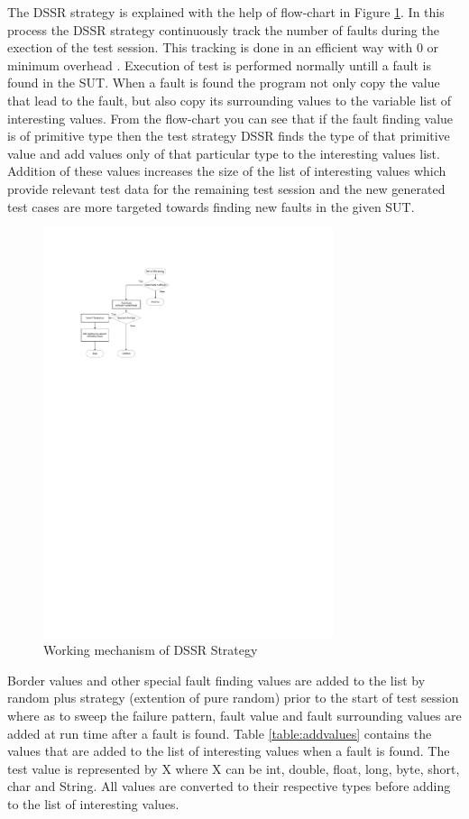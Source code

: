 \documentclass[10pt, conference, compsocconf]{IEEEtran}
\begin{document}
\hspace{10 mm}The DSSR strategy is explained with the help of flow-chart in Figure \ref{fig:Working_DSSS}. In this process the DSSR strategy continuously track the number of faults during the exection of the test session. This tracking is done in an efficient way with 0 or minimum overhead \cite{Leitner2009}. Execution of test is performed normally untill a fault is found in the SUT. When a fault is found the program not only copy the value that lead to the fault, but also copy its surrounding values to the variable list of interesting values. From the flow-chart you can see that if the fault finding value is of primitive type then the test strategy DSSR finds the type of that primitive value and add values only of that particular type to the interesting values list. Addition of these values increases the size of the list of interesting values which provide relevant test data for the remaining test session and the new generated test cases are more targeted towards finding new faults in the given SUT.\\

\begin{figure}[htp]
\centering
\includegraphics[width=8.5cm,height=12cm]{flowchart1.pdf}
\caption{Working mechanism of DSSR Strategy}
\label{fig:Working_DSSS}
\end{figure}

Border values and other special fault finding values are added to the list by random plus strategy (extention of pure random) prior to the start of test session where as to sweep the failure pattern, fault value and fault surrounding values are added at run time after a fault is found. Table \ref{table:addvalues} contains the values that are added to the list of interesting values when a fault is found. The test value is represented by X where X can be int, double, float, long, byte, short, char and String. All values are converted to their respective types before adding to the list of interesting values.
\end{document}
